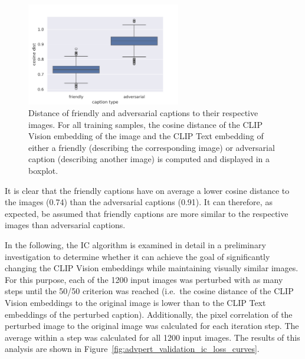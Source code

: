 \begin{figure}[ht]
    \centering
    \includegraphics[width=0.6\textwidth]{plots/advpert_sanity_check_friendly_vs_adversarial_cap.png}
    \caption[Similarity of caption embeddings to the respective images]{Distance of friendly and adversarial captions to their respective images. For all training samples, the cosine distance of the CLIP Vision embedding of the image and the CLIP Text embedding of either a friendly (describing the corresponding image) or adversarial caption (describing another image) is computed and displayed in a boxplot.}\label{fig:advpert_sanity_check_friendly_vs_adversarial_cap}
\end{figure}

\noindent{}It is clear that the friendly captions have on average a lower cosine distance to the images (0.74) than the adversarial captions (0.91). It can therefore, as expected, be assumed that friendly captions are more similar to the respective images than adversarial captions. 

In the following, the IC algorithm is examined in detail in a preliminary investigation to determine whether it can achieve the goal of significantly changing the CLIP Vision embeddings while maintaining visually similar images. For this purpose, each of the 1200 input images was perturbed with as many steps until the 50/50 criterion was reached (i.e.\ the cosine distance of the CLIP Vision embeddings to the original image is lower than to the CLIP Text embeddings of the perturbed caption). Additionally, the pixel correlation of the perturbed image to the original image was calculated for each iteration step. The average within a step was calculated for all 1200 input images. The results of this analysis are shown in Figure~\ref{fig:advpert_validation_ic_loss_curves}. 


